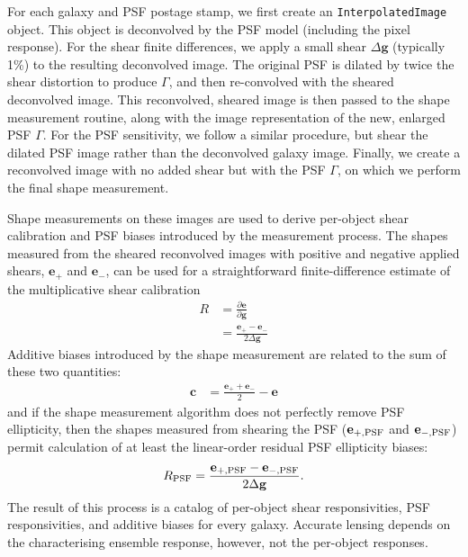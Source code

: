 \documentclass[iop]{emulateapj}
\newcommand\rmcomment[1]{\textcolor{red}{(RM: #1)}}
\begin{document}
For each galaxy and PSF postage stamp, we first create an
\texttt{InterpolatedImage} object. This object is deconvolved by the
PSF model (including the pixel response). For the shear finite
differences, we apply a small shear $\Delta\mathbf{g}$ (typically 1\%)
to the resulting deconvolved image. The original PSF is dilated by
twice the shear distortion to produce $\Gamma$, and then re-convolved
with the sheared deconvolved image. This reconvolved, sheared image is
then passed to the shape measurement routine, along with the image
representation of the new, enlarged PSF $\Gamma$. For the PSF
sensitivity, we follow a similar procedure, but shear the dilated PSF
image rather than the deconvolved galaxy image. Finally, we create a
reconvolved image with no added shear but with the PSF $\Gamma$, on
which we perform the final shape measurement.


Shape measurements on these images are used to derive per-object shear
calibration and PSF biases {introduced by the measurement
  process}. The shapes measured from the sheared reconvolved images
with positive and negative applied shears, $\mathbf{e}_{+}$ and
$\mathbf{e}_{-}$, can be used for a straightforward finite-difference
estimate of the multiplicative shear calibration
\begin{align}
R &= \frac{\partial \mathbf{e}}{\partial \mathbf{g}}  \\
 &=\frac{\mathbf{e}_{+} - \mathbf{e}_{-}}{2\Delta\mathbf{g}}
\end{align}
Additive biases introduced by the shape measurement are related to the
sum of these two quantities:
\begin{align}
\mathbf{c} &= \frac{\mathbf{e}_{+} + \mathbf{e}_{-}}{2} - \mathbf{e}
\end{align}
and if the shape measurement algorithm does not perfectly remove PSF
ellipticity, then the shapes measured from shearing the PSF
($\mathbf{e}_{+,\rm PSF}$ and $\mathbf{e}_{-,\rm PSF}$) permit calculation
of at least the linear-order residual PSF ellipticity biases:
\begin{align}
R_{\rm PSF} = \frac{\mathbf{e}_{+,\rm PSF} - \mathbf{e}_{-,\rm PSF}}{2\Delta\mathbf{g}}.
\end{align}
The result of this process is a catalog of per-object shear responsivities, PSF
responsivities, and additive biases for every galaxy. Accurate lensing
depends on the characterising ensemble response, however, not the
per-object responses. 
\end{document}
